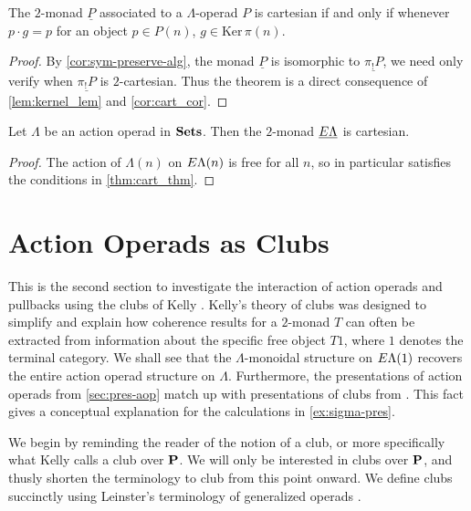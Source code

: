 \begin{thm}\label{thm:cart_thm}
The $2$-monad $\underline{P}$ associated to a $\Lambda$-operad $P$ is cartesian if and only if whenever $p \cdot g = p$ for an object $p \in P(n)$, $g \in \textrm{Ker} \, \pi (n)$.
\end{thm}
\begin{proof}
By \cref{cor:sym-preserve-alg}, the monad $\underline{P}$ is isomorphic to $\underline{\pi_{!}P}$, we need only verify when $\underline{\pi_{!}P}$ is $2$-cartesian. Thus the theorem is a direct consequence of \cref{lem:kernel_lem} and \cref{cor:cart_cor}.
\end{proof}

\begin{cor}\label{cor:EL-2cart}
Let $\Lambda$ be an action operad in $\mathbf{Sets}$. Then the $2$-monad $\underline{E\Lambda}$ is cartesian.
\end{cor}
\begin{proof}
The action of $\Lambda(n)$ on $E\Lambda(n)$ is free for all $n$, so in particular satisfies the conditions in \cref{thm:cart_thm}.
\end{proof}

\section{Action Operads as Clubs}\label{sec:club}

This is the second section to investigate the interaction of action operads and pullbacks using the clubs of Kelly \cite{kelly_club1, kelly_club0, kelly_club2}. Kelly's theory of clubs  was designed to simplify and explain how coherence results for a $2$-monad $T$ can often be extracted from information about the 
specific free object $T1$, where $1$ denotes the terminal category. 
We shall see that the $\Lambda$-monoidal structure on $E\Lambda(1)$ recovers the entire action operad structure on $\Lambda$. Furthermore, the presentations of action operads from \cref{sec:pres-aop} match up with presentations of clubs from \cite[Section 3]{kelly_club1}. This fact gives a conceptual explanation for the calculations in \cref{ex:sigma-pres}.

We begin by reminding the reader of the notion of a club, or more specifically what Kelly \cite{kelly_club1,kelly_club2} calls a club over $\mathbf{P}$. We will only be interested in clubs over $\mathbf{P}$, and thusly shorten the terminology to club from this point onward. We define clubs succinctly using Leinster's terminology of generalized operads \cite{leinster}.

